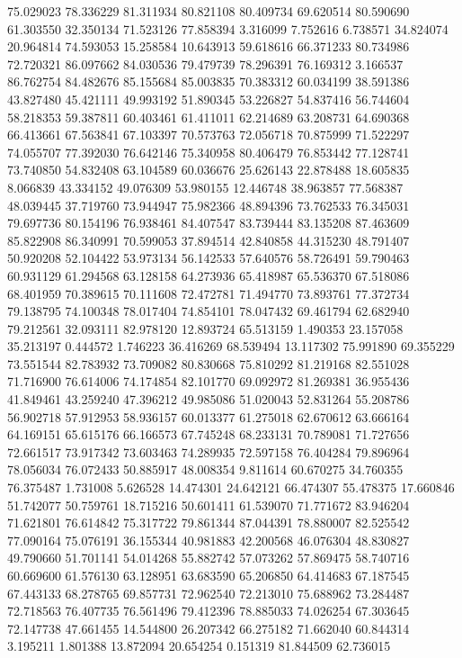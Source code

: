 75.029023
78.336229
81.311934
80.821108
80.409734
69.620514
80.590690
61.303550
32.350134
71.523126
77.858394
3.316099
7.752616
6.738571
34.824074
20.964814
74.593053
15.258584
10.643913
59.618616
66.371233
80.734986
72.720321
86.097662
84.030536
79.479739
78.296391
76.169312
3.166537
86.762754
84.482676
85.155684
85.003835
70.383312
60.034199
38.591386
43.827480
45.421111
49.993192
51.890345
53.226827
54.837416
56.744604
58.218353
59.387811
60.403461
61.411011
62.214689
63.208731
64.690368
66.413661
67.563841
67.103397
70.573763
72.056718
70.875999
71.522297
74.055707
77.392030
76.642146
75.340958
80.406479
76.853442
77.128741
73.740850
54.832408
63.104589
60.036676
25.626143
22.878488
18.605835
8.066839
43.334152
49.076309
53.980155
12.446748
38.963857
77.568387
48.039445
37.719760
73.944947
75.982366
48.894396
73.762533
76.345031
79.697736
80.154196
76.938461
84.407547
83.739444
83.135208
87.463609
85.822908
86.340991
70.599053
37.894514
42.840858
44.315230
48.791407
50.920208
52.104422
53.973134
56.142533
57.640576
58.726491
59.790463
60.931129
61.294568
63.128158
64.273936
65.418987
65.536370
67.518086
68.401959
70.389615
70.111608
72.472781
71.494770
73.893761
77.372734
79.138795
74.100348
78.017404
74.854101
78.047432
69.461794
62.682940
79.212561
32.093111
82.978120
12.893724
65.513159
1.490353
23.157058
35.213197
0.444572
1.746223
36.416269
68.539494
13.117302
75.991890
69.355229
73.551544
82.783932
73.709082
80.830668
75.810292
81.219168
82.551028
71.716900
76.614006
74.174854
82.101770
69.092972
81.269381
36.955436
41.849461
43.259240
47.396212
49.985086
51.020043
52.831264
55.208786
56.902718
57.912953
58.936157
60.013377
61.275018
62.670612
63.666164
64.169151
65.615176
66.166573
67.745248
68.233131
70.789081
71.727656
72.661517
73.917342
73.603463
74.289935
72.597158
76.404284
79.896964
78.056034
76.072433
50.885917
48.008354
9.811614
60.670275
34.760355
76.375487
1.731008
5.626528
14.474301
24.642121
66.474307
55.478375
17.660846
51.742077
50.759761
18.715216
50.601411
61.539070
71.771672
83.946204
71.621801
76.614842
75.317722
79.861344
87.044391
78.880007
82.525542
77.090164
75.076191
36.155344
40.981883
42.200568
46.076304
48.830827
49.790660
51.701141
54.014268
55.882742
57.073262
57.869475
58.740716
60.669600
61.576130
63.128951
63.683590
65.206850
64.414683
67.187545
67.443133
68.278765
69.857731
72.962540
72.213010
75.688962
73.284487
72.718563
76.407735
76.561496
79.412396
78.885033
74.026254
67.303645
72.147738
47.661455
14.544800
26.207342
66.275182
71.662040
60.844314
3.195211
1.801388
13.872094
20.654254
0.151319
81.844509
62.736015
